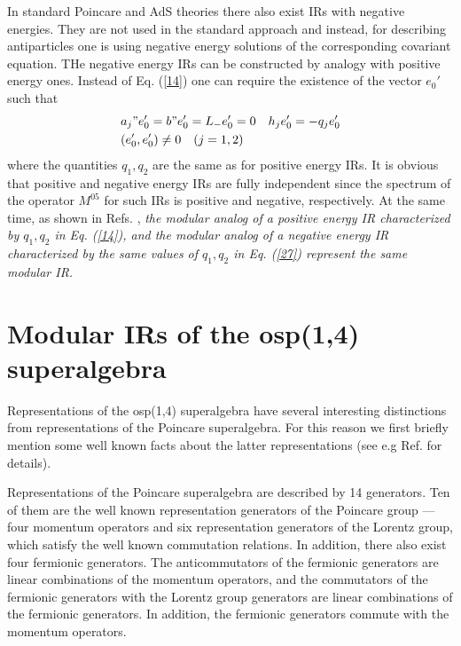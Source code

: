 \documentclass[a4paper,12pt]{article}%
\begin{document}
In standard Poincare and AdS theories there also exist IRs with
negative energies. They are not used in the standard approach and 
instead, for describing antiparticles one is using negative energy 
solutions of the corresponding covariant equation.
THe negative energy IRs can be constructed by analogy with 
positive energy ones.
Instead of Eq. (\ref{14}) one can require the existence of the
vector $e_0'$ such that
\begin{eqnarray}
&a_j"e_0'=b"e_0'=L_-e_0'=0\quad h_je_0'=-q_je_0'\nonumber\\
&(e_0',e_0')\neq 0\quad (j=1,2)
\label{27}
\end{eqnarray}
where the quantities $q_1,q_2$ are the same as for positive
energy IRs. It is obvious that positive and negative energy
IRs are fully independent since the spectrum of the operator
$M^{05}$ for such IRs is positive and negative, respectively.
At the same time, as shown in Refs. \cite{lev2,lev3},
{\it the modular analog of a positive energy IR 
characterized by $q_1,q_2$ in Eq. (\ref{14}), and the modular 
analog of a negative energy IR characterized by the same 
values of $q_1,q_2$ in Eq. (\ref{27}) represent the same
modular IR.} 

\section{Modular IRs of the osp(1,4) superalgebra}
\label{S4}

Representations of the osp(1,4) superalgebra have several interesting
distinctions from representations of the Poincare superalgebra. For
this reason we first briefly mention some well known facts about the
latter representations (see e.g Ref. \cite{Wein-super} for details).

Representations of the Poincare superalgebra are described by 14 
generators. Ten of them are the well known representation generators
of the Poincare group --- four momentum operators and six 
representation generators of the Lorentz group, which satisfy 
the well known commutation relations. In addition, there also 
exist four fermionic generators. The 
anticommutators of the fermionic generators are linear 
combinations of the momentum operators, and the commutators of 
the fermionic generators 
with the Lorentz group generators are linear combinations of the 
fermionic generators. In addition, the fermionic generators 
commute with the momentum operators. 
\end{document}
